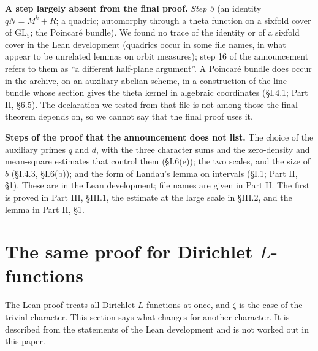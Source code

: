 \documentclass[11pt,letterpaper]{article}
\begin{document}
\textbf{A step largely absent from the final proof.} \emph{Step 3} (an identity $qN=M^k+R$; a quadric;
automorphy through a theta function on a sixfold cover of $\mathrm{GL}_5$; the Poincar\'e bundle). We found
no trace of the identity or of a sixfold cover in the Lean development (quadrics occur in some file names, in what appear to be unrelated lemmas on orbit measures); step 16 of the
announcement refers to them as ``a different half-plane argument''. A Poincar\'e bundle does occur in the archive, on an auxiliary abelian scheme, in a construction of the line
bundle whose section gives the theta kernel in algebraic coordinates (\S I.4.1; Part II, \S6.5). The
declaration we tested from that file is not among those the final theorem depends on, so we cannot say
that the final proof uses it.

\textbf{Steps of the proof that the announcement does not list.} The choice of the auxiliary primes $q$ and
$d$, with the three character sums and the zero-density and mean-square estimates that control them
(\S I.6(e)); the two scales, and the size of $b$ (\S I.4.3, \S I.6(b)); and the form of Landau's lemma on
intervals (\S I.1; Part II, \S1). These are in the Lean development; file names are given in Part II. The
first is proved in Part III, \S III.1, the estimate at the large scale in \S III.2, and the lemma in Part II, \S1.

\section{The same proof for Dirichlet $L$-functions}

The Lean proof treats all Dirichlet $L$-functions at once, and $\zeta$ is the case of the trivial character. This section says what changes for another character. It is described from the statements of the Lean development and is not worked out in this paper.
\end{document}
